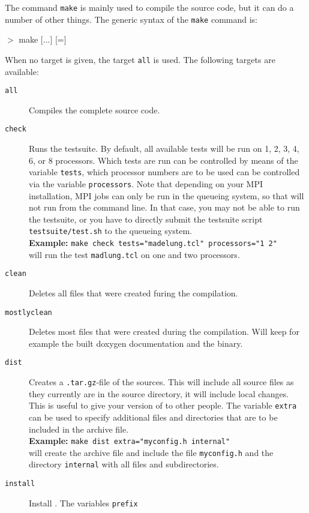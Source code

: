 The command \texttt{make} is mainly used to compile the \es{} source
code, but it can do a number of other things. The generic syntax of
the \texttt{make} command is:
\begin{code}
 $>$ make [...] [=]
\end{code}
When no target is given, the target \texttt{all} is used. The
following targets are available:
\begin{description}
\item[\texttt{all}] Compiles the complete \es{} source code.
\item[\texttt{check}] Runs the testsuite. By default, all available
  tests will be run on 1, 2, 3, 4, 6, or 8 processors. Which tests are
  run can be controlled by means of the variable \texttt{tests}, which
  processor numbers are to be used can be controlled via the variable
  \texttt{processors}. Note that depending on your MPI installation,
  MPI jobs can only be run in the queueing system, so that \es{} will
  not run from the command line. In that case, you may not be able to
  run the testsuite, or you have to directly submit the testsuite script
  \verb!testsuite/test.sh! to the queueing system.\\
  \textbf{Example:} \verb!make check tests="madelung.tcl" processors="1 2"!\\
  will run the test \texttt{madlung.tcl} on one and two processors.
\item[\texttt{clean}] Deletes all files that were created furing the
  compilation.
\item[\texttt{mostlyclean}] Deletes most files that were created
  during the compilation. Will keep for example the built doxygen
  documentation and the \es{} binary.
\item[\texttt{dist}] Creates a \texttt{.tar.gz}-file of the \es{}
  sources.  This will include all source files as they currently are
  in the source directory, \ie{} it will include local changes.  This
  is useful to give your version of \es{} to other people.
  The variable \texttt{extra} can be used to specify additional
  files and directories that are to be included in the archive
  file. \\
  \textbf{Example:} \verb!make dist extra="myconfig.h internal"!\\
  will create the archive file and include the file
  \texttt{myconfig.h} and the directory \texttt{internal} with all
  files and subdirectories.
\item[\texttt{install}] Install \es{}. The variables \texttt{prefix}

\end{description}
